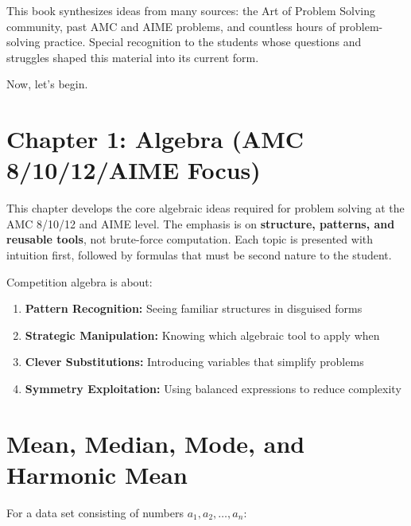 \documentclass[12pt]{extarticle}
\begin{document}
This book synthesizes ideas from many sources: the Art of Problem Solving community, past AMC and AIME problems, and countless hours of problem-solving practice. Special recognition to the students whose questions and struggles shaped this material into its current form.

\vspace{1cm}

Now, let's begin.

\newpage

\section*{Chapter 1: Algebra (AMC 8/10/12/AIME Focus)}

This chapter develops the core algebraic ideas required for problem solving at the AMC 8/10/12 and AIME level. The emphasis is on \textbf{structure, patterns, and reusable tools}, not brute-force computation. Each topic is presented with intuition first, followed by formulas that must be second nature to the student.

\begin{conceptbox}
Competition algebra is about:
\begin{enumerate}
    \item \textbf{Pattern Recognition:} Seeing familiar structures in disguised forms
    \item \textbf{Strategic Manipulation:} Knowing which algebraic tool to apply when
    \item \textbf{Clever Substitutions:} Introducing variables that simplify problems
    \item \textbf{Symmetry Exploitation:} Using balanced expressions to reduce complexity
\end{enumerate}
\end{conceptbox}

\section{Mean, Median, Mode, and Harmonic Mean}

For a data set consisting of numbers $a_1, a_2, \dots, a_n$:
\end{document}
